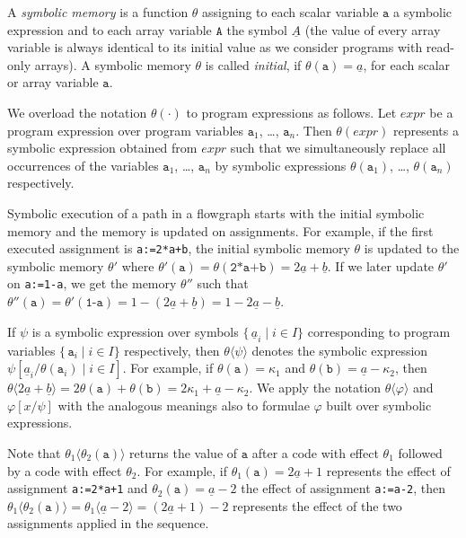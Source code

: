 \documentclass[10pt,a4paper]{article}
\newcommand{\var}[1]{\texttt{#1}}
\newcommand{\sym}[1]{\ensuremath{\underline{#1}}}
\begin{document}
A \emph{symbolic memory} is a function $\theta$ assigning to each scalar
variable $\var{a}$ a symbolic expression and to each array variable
$\var{A}$ the symbol $\sym{A}$ (the value of every array variable is always
identical to its initial value as we consider programs with read-only
arrays). A symbolic memory $\theta$ is called \emph{initial}, if
$\theta(\var{a})=\sym{a}$, for each scalar or array variable $\var{a}$.

We overload the notation $\theta(\cdot)$ to program expressions as follows.
Let $\textit{expr}$ be a program expression over program variables
$\var{a}_1$, \ldots, $\var{a}_n$. Then $\theta(\textit{expr})$ represents
a symbolic expression obtained from $\textit{expr}$ such that we
simultaneously replace all occurrences of the variables $\var{a}_1$,
\ldots, $\var{a}_n$ by symbolic expressions $\theta(\var{a}_1)$, \ldots,
$\theta(\var{a}_n)$ respectively.

Symbolic execution of a path in a flowgraph starts with the initial symbolic
memory and the memory is updated on assignments. For example, if the first
executed assignment is \texttt{a:=2*a+b}, the initial symbolic memory
$\theta$ is updated to the symbolic memory $\theta'$ where
$\theta'(\var{a})=\theta(\texttt{2*a+b})=2\sym{a}+\sym{b}$. If we later
update $\theta'$ on \texttt{a:=1-a}, we get the memory $\theta''$ such that
$\theta''(\var{a})=\theta'(\texttt{1-a})=1-(2\sym{a}+\sym{b})=
1-2\sym{a}-\sym{b}$.

If $\psi$ is a symbolic expression over symbols $\{\,\sym{a}_i \mid i \in
I\}$ corresponding to program variables $\{\,\var{a}_i \mid i \in I\}$
respectively, then $\theta\langle \psi \rangle$ denotes the symbolic
expression $ \psi[\sym{a}_i/\theta(\var{a}_i) \mid i \in I] $. For example,
if $\theta(\var{a})=\kappa_1$ and $\theta(\var{b})=\sym{a}-\kappa_2$, then
$\theta\langle2\sym{a}+\sym{b}\rangle=2\theta(\var{a})+\theta(\var{b})=
2\kappa_1+\sym{a}-\kappa_2$. We apply the notation
$\theta\langle\varphi\rangle$ and $\varphi[x/\psi]$ with the analogous
meanings also to formulae $\varphi$ built over symbolic
expressions. 

Note that $\theta_1\langle\theta_2(\var{a})\rangle$ returns the value of
$\var{a}$ after a code with effect $\theta_1$ followed by a code with effect
$\theta_2$. For example, if $\theta_1(\var{a})=2\sym{a}+1$ represents the
effect of assignment \texttt{a:=2*a+1} and $\theta_2(\var{a})=\sym{a}-2$ the
effect of assignment \texttt{a:=a-2}, then
$\theta_1\langle\theta_2(\var{a})\rangle=\theta_1\langle\sym{a}-2\rangle
=(2\sym{a}+1)-2$ represents the effect of the two assignments applied in the
sequence.
\end{document}
